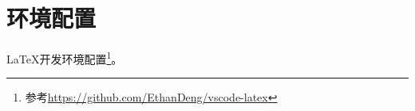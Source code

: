 \chapter{环境配置}
\label{chap:environment}

\LaTeX 开发环境配置\footnote{参考\href{https://github.com/EthanDeng/vscode-latex}{https://github.com/EthanDeng/vscode-latex}}。



